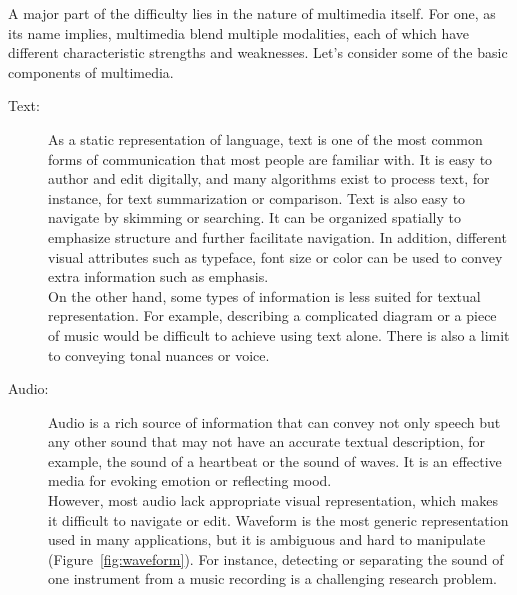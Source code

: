 A major part of the difficulty lies in the nature of multimedia itself. For one, as its name implies, multimedia blend multiple modalities, each of which have different characteristic strengths and weaknesses. Let's consider some of the basic components of multimedia.
\begin{description}
\item[Text:] As a static representation of language, text is one of the most common forms of communication that most people are familiar with. It is easy to author and edit digitally, and many algorithms exist to process text, for instance, for text summarization or comparison. Text is also easy to navigate by skimming or searching. It can be organized spatially to emphasize structure and further facilitate navigation. In addition, different visual attributes such as typeface, font size or color can be used to convey extra information such as emphasis.\\
On the other hand, some types of information is less suited for textual representation. For example, describing a complicated diagram or a piece of music would be difficult to achieve using text alone. There is also a limit to conveying tonal nuances or voice. \\

%
%
\item[Audio:] Audio is a rich source of information that can convey not only speech but any other sound that may not have an accurate textual description, for example, the sound of a heartbeat or the sound of waves. It is an effective media for evoking emotion or reflecting mood.\\
However, most audio lack appropriate visual representation, which makes it difficult to navigate or edit. Waveform is the most generic representation used in many applications, but it is ambiguous and hard to manipulate (Figure~\ref{fig:waveform}). 
For instance, detecting or separating the sound of one instrument from a music recording is a challenging research problem.\\


\end{description}
